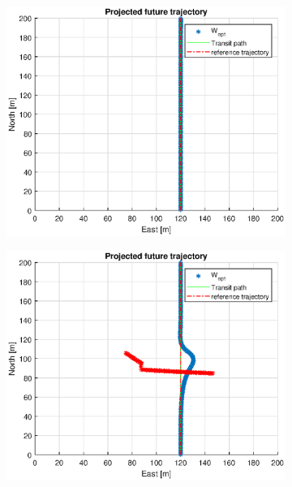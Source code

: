 \begin{figure} %
    \begin{subfigure}[b]{0.49\textwidth}
        \centering
        \includegraphics[width=\textwidth]{Images/Figures/sving_SO/Simple0_f999_Frame1}
    \end{subfigure}
    \hfill
    \begin{subfigure}[b]{0.499\textwidth}
        \centering
        \includegraphics[width=\textwidth]{Images/Figures/sving_SO/Simple0_f999_Frame2}

\end{subfigure}
\end{figure}
